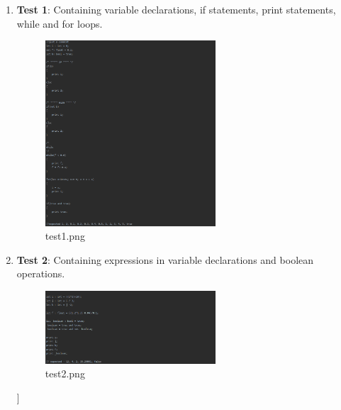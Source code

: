 \documentclass{article}
\begin{document}
			\begin{enumerate}
				\item \textbf{Test 1}: Containing variable declarations, if statements, print statements, while and for loops.
								\begin{figure}[H]
					\centering
			 			\includegraphics[width=0.6\textwidth]{test1.png}
			 			\centering
			  			\caption{test1.png}
			  			\label{fig:test1}
					\end{figure}
					
					\item \textbf{Test 2}: Containing expressions in variable declarations and boolean operations.
					
					\begin{figure}[H]
					\centering
			 			\includegraphics[width=0.6\textwidth]{test2.png}
			 			\centering
			  			\caption{test2.png}
			  			\label{fig:test2}
					\end{figure}]
					

\end{enumerate}
\end{document}
